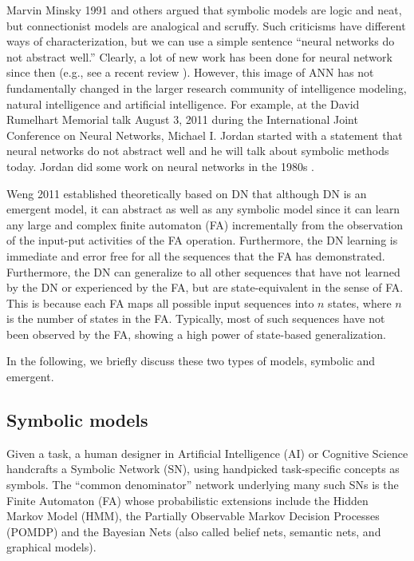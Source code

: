 \documentclass[conference]{IEEEtran}
\begin{document}
Marvin Minsky 1991 \cite{Minsky91} and others argued that symbolic models are logic and neat, but 
 connectionist models are analogical and scruffy.   Such criticisms have different ways of characterization, but
 we can use a simple sentence ``neural networks do not abstract well.''  Clearly, a lot of new work has been
 done for neural network since then (e.g., see a recent review \cite{WengRepRev12}).   However, this image of ANN has not fundamentally changed in the larger research community of intelligence modeling, natural intelligence
 and artificial intelligence.  For example, at the David Rumelhart Memorial talk August 3, 2011 during the International Joint Conference on Neural Networks, Michael I. Jordan started with a statement that neural networks do not abstract well and he will talk about symbolic methods today.  Jordan did some work on neural networks in the 1980s  \cite{Jordan86}. 
 
Weng 2011 \cite{WengWhy11} established theoretically based on DN that although DN is an emergent model,
it can abstract as well as any symbolic model since it can learn any large and complex finite
automaton (FA) incrementally from the observation of  the input-put activities of the FA operation.
Furthermore, the DN learning is immediate and error free for all the sequences that the FA has demonstrated.
Furthermore, the DN can generalize to all other sequences that have not learned by the DN or experienced by
the FA, but are state-equivalent in the sense of FA.   This is because each FA maps all possible 
input sequences into $n$ states, where $n$ is the number of states in the FA.  Typically, most of
such sequences have not been observed by the FA, showing a high power of state-based generalization. 
  
In the following, we briefly discuss these two types of models, symbolic and emergent. 

\subsection{Symbolic models}
Given a task, a human designer in Artificial Intelligence (AI) \cite{Soar87,Hawkins09} or Cognitive Science \cite{Anderson93,Tenenbaum06} handcrafts a Symbolic Network (SN), using handpicked task-specific 
concepts as symbols.   The ``common denominator'' network underlying many such SNs is the Finite Automaton (FA) whose probabilistic extensions include  
the Hidden Markov Model (HMM), the Partially Observable Markov Decision Processes (POMDP)
and the Bayesian Nets (also called belief nets, semantic nets, and graphical models).   
\end{document}
